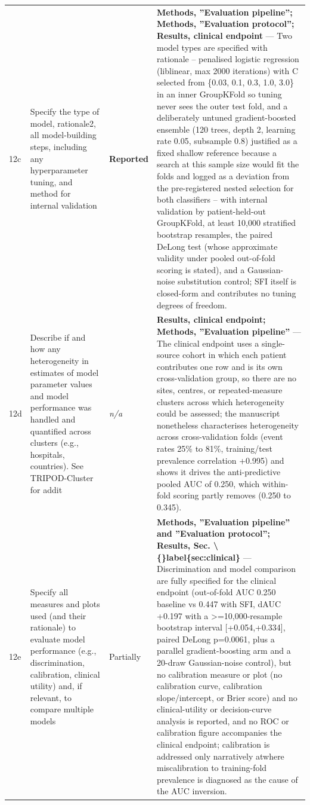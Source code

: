 \documentclass[10pt]{article}
\begin{document}
\begin{longtable}{@{}p{0.9cm} p{6.2cm} p{1.9cm} p{12.4cm}@{}}
12c & Specify the type of model, rationale2, all model-building steps, including any hyperparameter tuning, and method for internal validation & \textbf{Reported} & \textbf{Methods, ''Evaluation pipeline''; Methods, ''Evaluation protocol''; Results, clinical endpoint} --- Two model types are specified with rationale -- penalised logistic regression (liblinear, max 2000 iterations) with C selected from \{0.03, 0.1, 0.3, 1.0, 3.0\} in an inner GroupKFold so tuning never sees the outer test fold, and a deliberately untuned gradient-boosted ensemble (120 trees, depth 2, learning rate 0.05, subsample 0.8) justified as a fixed shallow reference because a search at this sample size would fit the folds and logged as a deviation from the pre-registered nested selection for both classifiers -- with internal validation by patient-held-out GroupKFold, at least 10,000 stratified bootstrap resamples, the paired DeLong test (whose approximate validity under pooled out-of-fold scoring is stated), and a Gaussian-noise substitution control; SFI itself is closed-form and contributes no tuning degrees of freedom. \\[2pt]
12d & Describe if and how any heterogeneity in estimates of model parameter values and model performance was handled and quantified across clusters (e.g., hospitals, countries). See TRIPOD-Cluster for addit & \emph{n/a} & \textbf{Results, clinical endpoint; Methods, ''Evaluation pipeline''} --- The clinical endpoint uses a single-source cohort in which each patient contributes one row and is its own cross-validation group, so there are no sites, centres, or repeated-measure clusters across which heterogeneity could be assessed; the manuscript nonetheless characterises heterogeneity across cross-validation folds (event rates 25\% to 81\%, training/test prevalence correlation +0.995) and shows it drives the anti-predictive pooled AUC of 0.250, which within-fold scoring partly removes (0.250 to 0.345). \\[2pt]
12e & Specify all measures and plots used (and their rationale) to evaluate model performance (e.g., discrimination, calibration, clinical utility) and, if relevant, to compare multiple models & Partially & \textbf{Methods, ''Evaluation pipeline'' and ''Evaluation protocol''; Results, Sec. \textbackslash\{\}label\{sec:clinical\}} --- Discrimination and model comparison are fully specified for the clinical endpoint (out-of-fold AUC 0.250 baseline vs 0.447 with SFI, dAUC +0.197 with a >=10,000-resample bootstrap interval [+0.054,+0.334], paired DeLong p=0.0061, plus a parallel gradient-boosting arm and a 20-draw Gaussian-noise control), but no calibration measure or plot (no calibration curve, calibration slope/intercept, or Brier score) and no clinical-utility or decision-curve analysis is reported, and no ROC or calibration figure accompanies the clinical endpoint; calibration is addressed only narratively atwhere miscalibration to training-fold prevalence is diagnosed as the cause of the AUC inversion. \\[2pt]

\end{longtable}
\end{document}

